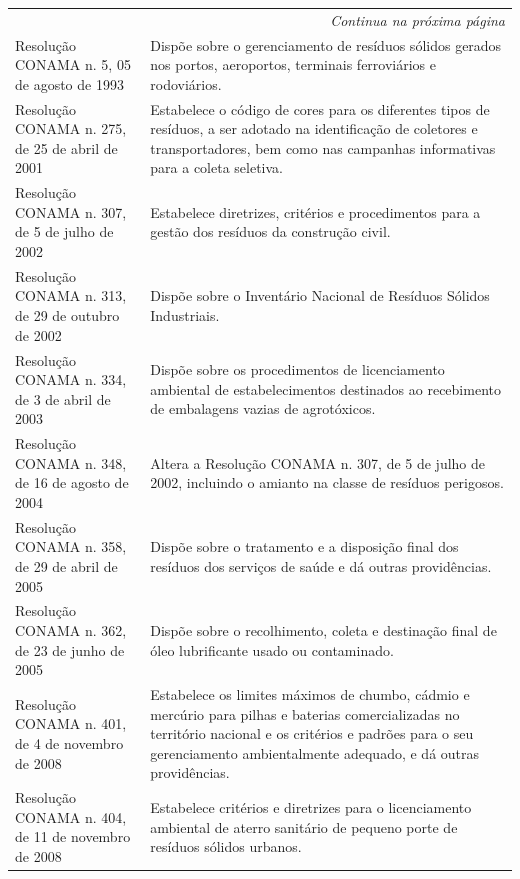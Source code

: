 \begin{center}
\begin{longtable}{|p{}|p{}|}
			\hline \multicolumn{2}{r}{\textit{Continua na próxima página}} \\
			\endfoot
			\hline
			\endlastfoot
			Resolução CONAMA n.  5, 05 de agosto de 1993 & Dispõe sobre o gerenciamento de resíduos sólidos gerados nos portos, aeroportos, terminais ferroviários e rodoviários. \\
			\hline
			Resolução   CONAMA   n.   275, de 25 de abril de 2001 & Estabelece  o  código  de  cores  para  os  diferentes  tipos  de  resíduos,  a  ser adotado  na  identificação  de  coletores  e  transportadores,  bem  como  nas campanhas informativas para a coleta seletiva. \\
			\hline
			Resolução   CONAMA   n.   307, de 5 de julho de 2002 & Estabelece diretrizes, critérios e procedimentos para a gestão dos resíduos da construção civil. \\
			\hline
			Resolução   CONAMA   n.   313, de 29 de outubro de 2002 & Dispõe sobre o Inventário Nacional de Resíduos Sólidos Industriais. \\
			\hline
			Resolução   CONAMA   n.   334, de 3 de abril de 2003 & Dispõe     sobre     os     procedimentos     de     licenciamento     ambiental     de estabelecimentos   destinados   ao   recebimento   de   embalagens   vazias   de agrotóxicos. \\
			\hline
			Resolução   CONAMA   n.   348, de 16 de agosto de 2004 & Altera  a  Resolução  CONAMA  n.  307,  de  5  de  julho  de  2002,  incluindo  o amianto na classe de resíduos perigosos. \\
			\hline
			Resolução   CONAMA   n.   358, de 29 de abril de 2005 & Dispõe sobre o tratamento e a disposição final dos resíduos dos serviços de saúde e dá outras providências. \\
			\hline
			Resolução   CONAMA   n.   362, de 23 de junho de 2005 & Dispõe  sobre  o  recolhimento,  coleta  e  destinação  final  de  óleo  lubrificante usado ou contaminado. \\
			\hline
			Resolução   CONAMA   n.   401, de 4 de novembro de 2008 & Estabelece os limites máximos de chumbo, cádmio e mercúrio para pilhas e baterias comercializadas no território nacional e os critérios e padrões para o seu gerenciamento ambientalmente adequado, e dá outras providências. \\
			\hline
			Resolução   CONAMA   n.   404, de 11 de novembro de 2008 & Estabelece  critérios  e  diretrizes  para  o  licenciamento  ambiental  de  aterro sanitário de pequeno porte de resíduos sólidos urbanos. \\

\end{longtable}
\end{center}
